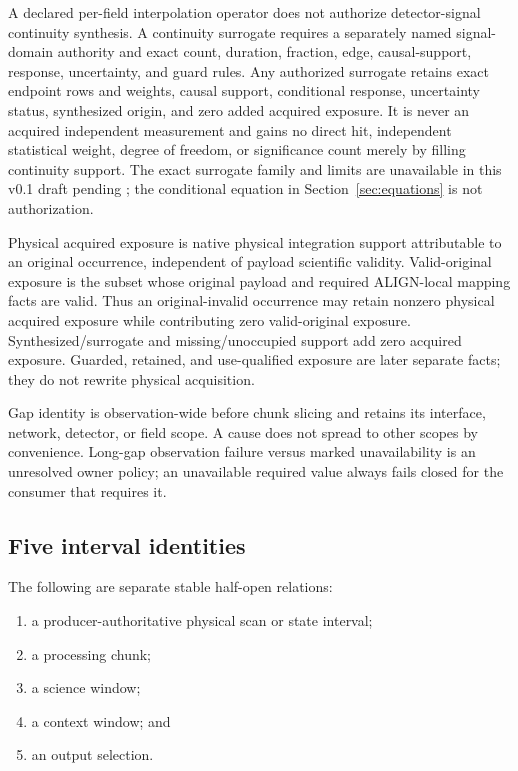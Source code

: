 A declared per-field interpolation operator does not authorize
detector-signal continuity synthesis.  A continuity surrogate requires a
separately named signal-domain authority and exact count, duration, fraction,
edge, causal-support, response, uncertainty, and guard rules.  Any authorized
surrogate retains exact endpoint rows and weights, causal support, conditional
response, uncertainty status, synthesized origin, and zero added acquired
exposure.  It is never an acquired independent measurement and gains no
direct hit, independent statistical weight, degree of freedom, or significance
count merely by filling continuity support.  The exact surrogate family and
limits are unavailable in this v0.1 draft pending ;
the conditional equation in Section~\ref{sec:equations} is not authorization.

Physical acquired exposure is native physical integration support attributable
to an original occurrence, independent of payload scientific validity.
Valid-original exposure is the subset whose original payload and required
ALIGN-local mapping facts are valid.  Thus an original-invalid occurrence may
retain nonzero physical acquired exposure while contributing zero
valid-original exposure.  Synthesized/surrogate and missing/unoccupied support
add zero acquired exposure.  Guarded, retained, and use-qualified exposure are
later separate facts; they do not rewrite physical acquisition.

Gap identity is observation-wide before chunk slicing and retains its
interface, network, detector, or field scope.  A cause does not spread to
other scopes by convenience.  Long-gap observation failure versus marked
unavailability is an unresolved owner policy; an unavailable required value
always fails closed for the consumer that requires it.

\subsection{Five interval identities}

The following are separate stable half-open relations:

\begin{enumerate}
\item a producer-authoritative physical scan or state interval;
\item a processing chunk;
\item a science window;
\item a context window; and
\item an output selection.
\end{enumerate}

